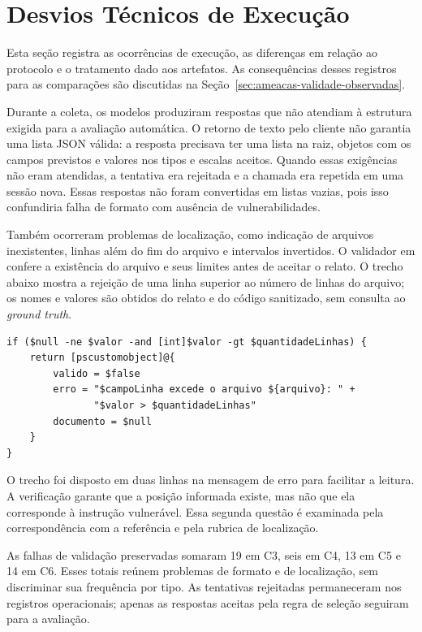 \section{Desvios Técnicos de Execução}\label{sec:desvios-protocolo}

Esta seção registra as ocorrências de execução, as diferenças em relação ao protocolo e o tratamento dado aos artefatos. As consequências desses registros para as comparações são discutidas na Seção~\ref{sec:ameacas-validade-observadas}.

Durante a coleta, os modelos produziram respostas que não atendiam à estrutura exigida para a avaliação automática. O retorno de texto pelo cliente não garantia uma lista JSON válida: a resposta precisava ter uma lista na raiz, objetos com os campos previstos e valores nos tipos e escalas aceitos. Quando essas exigências não eram atendidas, a tentativa era rejeitada e a chamada era repetida em uma sessão nova. Essas respostas não foram convertidas em listas vazias, pois isso confundiria falha de formato com ausência de vulnerabilidades.

Também ocorreram problemas de localização, como indicação de arquivos inexistentes, linhas além do fim do arquivo e intervalos invertidos. O validador em  confere a existência do arquivo e seus limites antes de aceitar o relato. O trecho abaixo mostra a rejeição de uma linha superior ao número de linhas do arquivo; os nomes e valores são obtidos do relato e do código sanitizado, sem consulta ao \textit{ground truth}.

\begingroup\footnotesize
\begin{verbatim}
if ($null -ne $valor -and [int]$valor -gt $quantidadeLinhas) {
    return [pscustomobject]@{
        valido = $false
        erro = "$campoLinha excede o arquivo ${arquivo}: " +
               "$valor > $quantidadeLinhas"
        documento = $null
    }
}
\end{verbatim}
\endgroup

O trecho foi disposto em duas linhas na mensagem de erro para facilitar a leitura. A verificação garante que a posição informada existe, mas não que ela corresponde à instrução vulnerável. Essa segunda questão é examinada pela correspondência com a referência e pela rubrica de localização.

As falhas de validação preservadas somaram 19 em C3, seis em C4, 13 em C5 e 14 em C6. Esses totais reúnem problemas de formato e de localização, sem discriminar sua frequência por tipo. As tentativas rejeitadas permaneceram nos registros operacionais; apenas as respostas aceitas pela regra de seleção seguiram para a avaliação.

